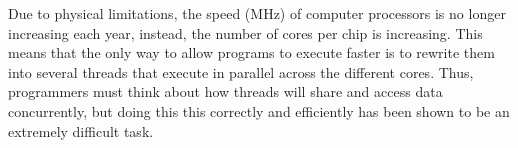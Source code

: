 \documentclass[11pt,letterpaper]{article}
\begin{document}
\newlength {\squarewidth}
\renewenvironment {square}
{
\setlength {\squarewidth} {\linewidth}
\addtolength {\squarewidth} {-12pt}
\renewcommand{\baselinestretch}{0.75} \footnotesize
\begin {center}
\begin {tabular} {|c|} \hline
\begin {minipage} {\squarewidth}
\medskip
}{
\end {minipage}
\\ \hline
\end{tabular}
\end{center}
}  
 
\newtheorem{definition}{Definition}
\newtheorem{theorem}{Theorem}
\newtheorem{lemma}{Lemma}
\newtheorem{corollary}{Corollary}
\newcommand{\toto}{xxx}
\newenvironment{proofT}{\noindent{\bf
Proof }} {\hspace*{\fill}$\Box_{Theorem~\ref{\toto}}$\par\vspace{3mm}}
\newenvironment{proofL}{\noindent{\bf
Proof }} {\hspace*{\fill}$\Box_{Lemma~\ref{\toto}}$\par\vspace{3mm}}
\newenvironment{proofC}{\noindent{\bf
Proof }} {\hspace*{\fill}$\Box_{Corollary~\ref{\toto}}$\par\vspace{3mm}}


\newcommand{\linenumbering}{\ifthenelse{\value{linecounter}<10}
{(0\arabic{linecounter})}{(\arabic{linecounter})}}
\renewcommand{\line}[1]{\refstepcounter{linecounter}\label{#1}\linenumbering}
\newcommand{\resetline}[1]{\setcounter{linecounter}{0}#1}
\renewcommand{\thelinecounter}{\ifnum \value{linecounter} > 
9\else 0\fi \arabic{linecounter}}

\newcommand{\tuple}[1]{\ensuremath{\left \langle #1 \right \rangle }}



Due to physical limitations, the speed (MHz) of computer processors is no longer increasing each year,
instead, the number of cores per chip is increasing.
This means that the only way to allow programs to execute faster is to rewrite them
into several threads that execute in parallel across the different cores.
Thus, programmers must think about how threads will share and access data concurrently, but doing this
this correctly and efficiently has been shown to be an extremely difficult task.
\end{document}
